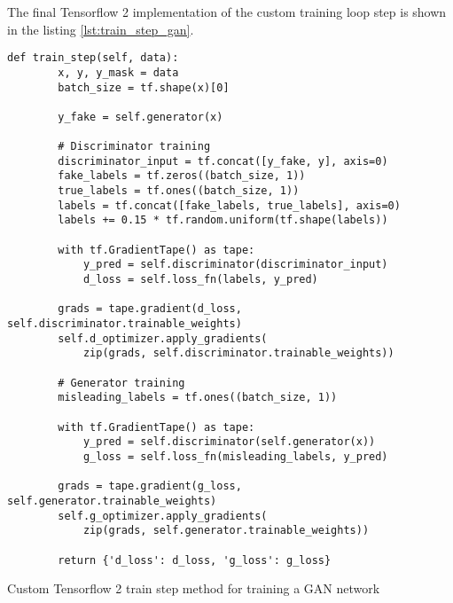The final Tensorflow 2 implementation of the custom training loop step is shown in the listing \ref{lst:train_step_gan}.
\begin{listing}
\begin{verbatim}
def train_step(self, data):
        x, y, y_mask = data
        batch_size = tf.shape(x)[0]

        y_fake = self.generator(x)

        # Discriminator training
        discriminator_input = tf.concat([y_fake, y], axis=0)
        fake_labels = tf.zeros((batch_size, 1))
        true_labels = tf.ones((batch_size, 1))
        labels = tf.concat([fake_labels, true_labels], axis=0)
        labels += 0.15 * tf.random.uniform(tf.shape(labels))

        with tf.GradientTape() as tape:
            y_pred = self.discriminator(discriminator_input)
            d_loss = self.loss_fn(labels, y_pred)

        grads = tape.gradient(d_loss, self.discriminator.trainable_weights)
        self.d_optimizer.apply_gradients(
            zip(grads, self.discriminator.trainable_weights))

        # Generator training
        misleading_labels = tf.ones((batch_size, 1))

        with tf.GradientTape() as tape:
            y_pred = self.discriminator(self.generator(x))
            g_loss = self.loss_fn(misleading_labels, y_pred)

        grads = tape.gradient(g_loss, self.generator.trainable_weights)
        self.g_optimizer.apply_gradients(
            zip(grads, self.generator.trainable_weights))

        return {'d_loss': d_loss, 'g_loss': g_loss}
\end{verbatim}
\caption{Custom Tensorflow 2 train step method for training a GAN network}
\label{lst:train_step_gan}
\end{listing}

